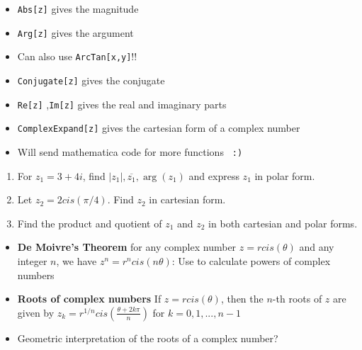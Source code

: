 \documentclass[12pt]{article}
\begin{document}
\begin{itemize}
\begin{itemize}
        \item \texttt{Abs[z]} gives the magnitude
        \item \texttt{Arg[z]} gives the argument
        \item Can also use \texttt{ArcTan[x,y]}!!
        \item \texttt{Conjugate[z]} gives the conjugate 
        \item \texttt{Re[z]} ,\texttt{Im[z]}  gives the real and imaginary parts
        \item \texttt{ComplexExpand[z]} gives the cartesian form of a complex number
        \item Will send mathematica code for more functions \texttt{ :) } 
    \end{itemize}
\end{itemize}

\begin{enumerate}
    \item For $ z_{1} = 3 + 4i$, find $|z_{1}|, \overline{z_{1}}, \arg(z_{1})$ and express $z_{1}$ in polar form.
    \vspace{3cm}
    \item Let $z_{2} = 2 cis(\pi/4)$. Find $z_{2}$ in cartesian form.
    \vspace{3cm}
    \item Find the product and quotient of $z_{1}$ and $z_{2}$ in both cartesian and polar forms.
    \vspace{3cm}
\end{enumerate}


\begin{itemize}
    \item \textbf{De Moivre's Theorem} for any complex number $z = r cis(\theta)$ and any integer $n$, we have $z^n = r^n cis(n\theta)$: Use to calculate powers of complex numbers
    \item \textbf{Roots of complex numbers} If $z = r cis(\theta)$, then the $n$-th roots of $z$ are given by $z_k = r^{1/n} cis\left( \frac{\theta + 2k\pi}{n} \right)$ for $k = 0, 1, ..., n-1$
    \item Geometric interpretation of the roots of a complex number?
\end{itemize}
\end{document}
